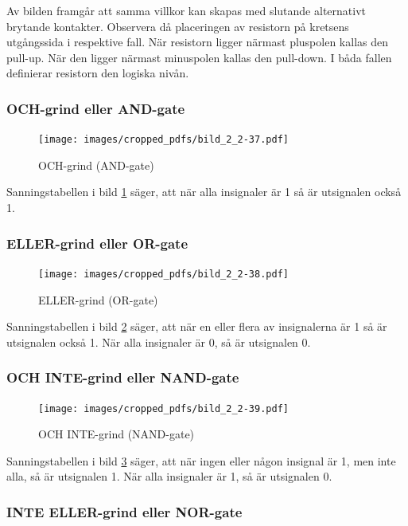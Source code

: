 Av bilden framgår att samma villkor kan skapas med slutande alternativt brytande
kontakter. Observera då placeringen av resistorn på kretsens utgångssida i
respektive fall. När resistorn ligger närmast pluspolen kallas den pull-up. När
den ligger närmast minuspolen kallas den pull-down. I båda fallen definierar
resistorn den logiska nivån.

\subsubsection{OCH-grind eller AND-gate}

\begin{figure}
\texttt{[image: images/cropped\_pdfs/bild\_2\_2-37.pdf]}
\caption{OCH-grind (AND-gate)}
\label{fig:BildII2-37}
\end{figure}

Sanningstabellen i bild \ref{fig:BildII2-37} säger, att när alla insignaler
är 1 så är utsignalen också 1.

\subsubsection{ELLER-grind eller OR-gate}

\begin{figure}
\texttt{[image: images/cropped\_pdfs/bild\_2\_2-38.pdf]}
\caption{ELLER-grind (OR-gate)}
\label{fig:BildII2-38}
\end{figure}

Sanningstabellen i bild \ref{fig:BildII2-38} säger, att när en eller flera av
insignalerna är 1 så är utsignalen också 1.
När alla insignaler är 0, så är utsignalen 0.

\subsubsection{OCH INTE-grind eller NAND-gate}

\begin{figure}
\texttt{[image: images/cropped\_pdfs/bild\_2\_2-39.pdf]}
\caption{OCH INTE-grind (NAND-gate)}
\label{fig:BildII2-39}
\end{figure}

Sanningstabellen i bild \ref{fig:BildII2-39} säger, att när ingen eller någon
insignal är 1, men inte alla, så är utsignalen 1.
När alla insignaler är 1, så är utsignalen 0.

\subsubsection{INTE ELLER-grind eller NOR-gate}

